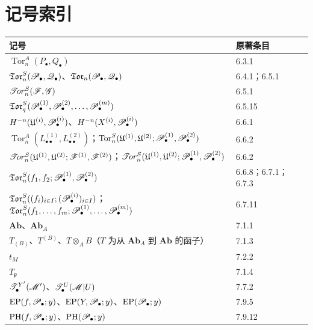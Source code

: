 \section*{记号索引}
\begin{longtable}{@{}p{.77\linewidth}p{.18\linewidth}@{}}
\toprule 记号 & 原著条目\\\midrule\endhead
$\operatorname{Tor}_n^A(P_\bullet,Q_\bullet)$ & 6.3.1\\
$\mathfrak{Tor}_n^S(\mathscr P_\bullet,\mathscr Q_\bullet)$、$\mathfrak{Tor}_n(\mathscr P_\bullet,\mathscr Q_\bullet)$ & 6.4.1；6.5.1\\
$\mathscr{T}\!or_n^S(\mathscr F,\mathscr G)$ & 6.5.1\\
$\mathfrak{Tor}_q^S(\mathscr P_\bullet^{(1)},\mathscr P_\bullet^{(2)},\ldots,\mathscr P_\bullet^{(m)})$ & 6.5.15\\
$H^{-n}(\mathfrak U^{(i)},\mathscr P_\bullet^{(i)})$、$H^{-n}(X^{(i)},\mathscr P_\bullet^{(i)})$ & 6.6.1\\
$\operatorname{Tor}_n^A(L_{\bullet\bullet}^{(1)},L_{\bullet\bullet}^{(2)})$；$\operatorname{Tor}_n^S(\mathfrak U^{(1)},\mathfrak U^{(2)};\mathscr P_\bullet^{(1)},\mathscr P_\bullet^{(2)})$ & 6.6.2\\
$\mathscr{T}\!or_n^S(\mathfrak U^{(1)},\mathfrak U^{(2)};\mathscr F^{(1)},\mathscr F^{(2)})$；$\mathscr{T}\!or_n^S(\mathfrak U^{(1)},\mathfrak U^{(2)};\mathscr P_\bullet^{(1)},\mathscr P_\bullet^{(2)})$ & 6.6.2\\
$\mathfrak{Tor}_n^S(f_1,f_2;\mathscr P_\bullet^{(1)},\mathscr P_\bullet^{(2)})$ & 6.6.8；6.7.1；6.7.3\\
$\mathfrak{Tor}_n^S((f_i)_{i\in I};(\mathscr P_\bullet^{(i)})_{i\in I})$；$\mathfrak{Tor}_n^S(f_1,\ldots,f_m;\mathscr P_\bullet^{(1)},\ldots,\mathscr P_\bullet^{(m)})$ & 6.7.11\\
$\mathbf{Ab}$、$\mathbf{Ab}_A$ & 7.1.1\\
$T_{(B)}$、$T^{(B)}$、$T\otimes_A B$（$T$ 为从 $\mathbf{Ab}_A$ 到 $\mathbf{Ab}$ 的函子） & 7.1.3\\
$t_M$ & 7.2.2\\
$T_{\mathfrak p}$ & 7.1.4\\
$\mathscr T_\bullet^{Y'}(\mathscr M')$、$\mathscr T_\bullet^U(\mathscr M|U)$ & 7.7.2\\
$\operatorname{EP}(f,\mathscr P_\bullet;y)$、$\operatorname{EP}(Y,\mathscr P_\bullet;y)$、$\operatorname{EP}(\mathscr P_\bullet;y)$ & 7.9.5\\
$\operatorname{PH}(f,\mathscr P_\bullet;y)$、$\operatorname{PH}(\mathscr P_\bullet;y)$ & 7.9.12\\
\bottomrule
\end{longtable}

